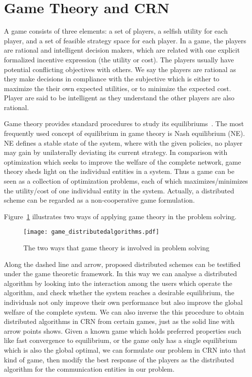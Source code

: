 \section{Game Theory and CRN}

A game consists of three elements: a set of players, a selfish utility for each player, and a set of feasible strategy space for each player.
In a game, the players are rational and intelligent decision makers, which are related with one explicit formalized incentive expression (the utility or cost).
The players usually have potential conflicting objectives with others.
We say the players are rational as they make decisions in compliance with the subjective which is either to maximize the their own expected utilities, or to minimize the expected cost.
Player are said to be intelligent as they understand the other players are also rational.
%

Game theory provides standard procedures to study its equilibriums~\cite{game_for_communication_01}.
The most frequently used concept of equilibrium in game theory is Nash equilibrium (\gls{NE}).
NE defines a stable state of the system, where with the given policies, no player may gain by unilaterally deviating its current strategy.
In comparison with optimization which seeks to improve the welfare of the complete network, game theory sheds light on the individual entities in a system.
Thus a game can be seen as a collection of optimization problems, each of which maximizes/minimizes the utility/cost of one individual entity in the system.
Actually, a distributed scheme can be regarded as a non-cooperative game formulation. 


Figure~\ref{game_distributedalgorithms} illustrates two ways of applying game theory in the problem solving.
\begin{figure}[h!]
  \centering
  \texttt{[image: game\_distributedalgorithms.pdf]}
  \caption{The two ways that game theory is involved in problem solving}
\label{game_distributedalgorithms}
\end{figure}
Along the dashed line and arrow, proposed distributed schemes can be testified under the game theoretic framework.
In this way we can analyse a distributed algorithm by looking into the interaction among the users which operate the algorithm, and check whether the system reaches a desirable equilibrium, \ie the individuals not only improve their own performance but also improve the global welfare of the complete system.
We can also inverse the this procedure to obtain distributed algorithms in CRN from certain games, just as the solid line with arrow points shows.
Given a known game which holds preferred properties such like fast convergence to equilibrium, or the game only has a single equilibrium which is also the global optimal, we can formulate our problem in CRN into that kind of game, then modify the best response of the players as the distributed algorithm for the communication entities in our problem. 


